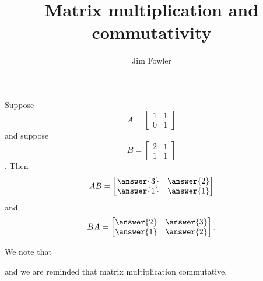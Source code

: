\documentclass{ximera}
\title{Matrix multiplication and commutativity}
\author{Jim Fowler}
\begin{document}
\begin{problem}
Suppose
\[
  A = \begin{bmatrix}
    1 & 1 \\
    0 & 1
  \end{bmatrix}
\]
and suppose
\[
  B = \begin{bmatrix}
    2 & 1 \\
    1 & 1
  \end{bmatrix}  
\].
Then
\[
  AB =
  \begin{bmatrix}
    \answer{3} & \answer{2} \\
    \answer{1} & \answer{1}
  \end{bmatrix}
\]
and
\[
  BA = \begin{bmatrix}
    \answer{2} & \answer{3} \\
    \answer{1} & \answer{2}
  \end{bmatrix}.
\]

\begin{problem}
  We note that
  \begin{multipleChoice}
  \end{multipleChoice}
  and we are reminded that matrix multiplication
   commutative.
\end{problem}
\end{problem}
\end{document}
